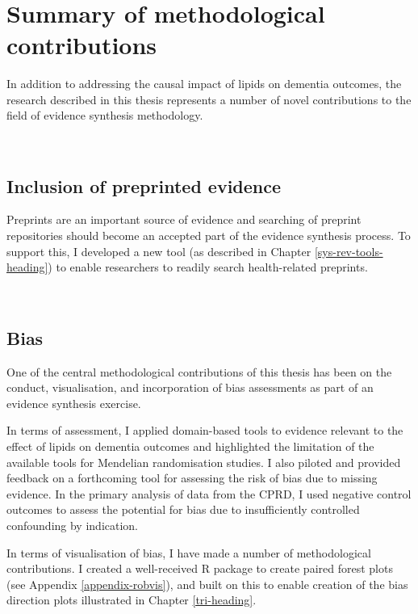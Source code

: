 \documentclass[a4paper, twoside]{templates/ociamthesis}
\begin{document}
~

\hypertarget{summary-of-methodological-contributions}{%
\section{Summary of methodological contributions}\label{summary-of-methodological-contributions}}

In addition to addressing the causal impact of lipids on dementia outcomes, the research described in this thesis represents a number of novel contributions to the field of evidence synthesis methodology.

~

\hypertarget{inclusion-of-preprinted-evidence}{%
\subsection{Inclusion of preprinted evidence}\label{inclusion-of-preprinted-evidence}}

Preprints are an important source of evidence and searching of preprint repositories should become an accepted part of the evidence synthesis process. To support this, I developed a new tool (as described in Chapter \ref{sys-rev-tools-heading}) to enable researchers to readily search health-related preprints.

~

\hypertarget{bias}{%
\subsection{Bias}\label{bias}}

One of the central methodological contributions of this thesis has been on the conduct, visualisation, and incorporation of bias assessments as part of an evidence synthesis exercise.

In terms of assessment, I applied domain-based tools to evidence relevant to the effect of lipids on dementia outcomes and highlighted the limitation of the available tools for Mendelian randomisation studies. I also piloted and provided feedback on a forthcoming tool for assessing the risk of bias due to missing evidence. In the primary analysis of data from the CPRD, I used negative control outcomes to assess the potential for bias due to insufficiently controlled confounding by indication.

In terms of visualisation of bias, I have made a number of methodological contributions. I created a well-received R package to create paired forest plots (see Appendix \ref{appendix-robvis}), and built on this to enable creation of the bias direction plots illustrated in Chapter \ref{tri-heading}.
\end{document}
